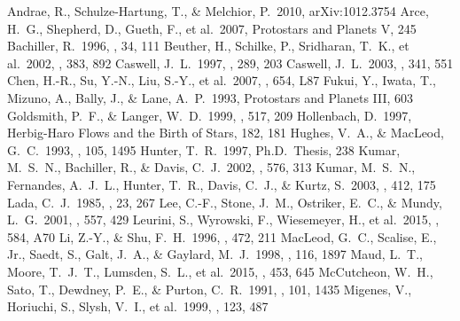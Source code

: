\documentclass[twocolumn]{aastex61}
\begin{document}
\begin{thebibliography}{}
 Andrae, R., Schulze-Hartung, T., \& Melchior, P.\ 2010, arXiv:1012.3754
 Arce, H.~G., Shepherd, D., Gueth, F., et al.\ 2007, Protostars and Planets V, 245 
 Bachiller, R.\ 1996, \araa, 34, 111 
 Beuther, H., Schilke, P., Sridharan, T.~K., et al.\ 2002, \aap, 383, 892
 Caswell, J.~L.\ 1997, \mnras, 289, 203 
 Caswell, J.~L.\ 2003, \mnras, 341, 551 
 Chen, H.-R., Su, Y.-N., Liu, S.-Y., et al.\ 2007, \apjl, 654, L87 
 Fukui, Y., Iwata, T., Mizuno, A., Bally, J., \& Lane, A.~P.\ 1993, Protostars and Planets III, 603
 Goldsmith, P.~F., \& Langer, W.~D.\ 1999, \apj, 517, 209 
 Hollenbach, D.\ 1997, Herbig-Haro Flows and the Birth of Stars, 182, 181 
 Hughes, V.~A., \& MacLeod, G.~C.\ 1993, \aj, 105, 1495
 Hunter, T.~R.\ 1997, Ph.D.~Thesis, 238 
 Kumar, M.~S.~N., Bachiller, R., \& Davis, C.~J.\ 2002, \apj, 576, 313 
 Kumar, M.~S.~N., Fernandes, A.~J.~L., Hunter, T.~R., Davis, C.~J., \& Kurtz, S.\ 2003, \aap, 412, 175 
 Lada, C.~J.\ 1985, \araa, 23, 267 
 Lee, C.-F., Stone, J.~M., Ostriker, E.~C., \& Mundy, L.~G.\ 2001, \apj, 557, 429 
 Leurini, S., Wyrowski, F., Wiesemeyer, H., et al.\ 2015, \aap, 584, A70 
 Li, Z.-Y., \& Shu, F.~H.\ 1996, \apj, 472, 211
 MacLeod, G.~C., Scalise, E., Jr., Saedt, S., Galt, J.~A., \& Gaylard, M.~J.\ 1998, \aj, 116, 1897 
 Maud, L.~T., Moore, T.~J.~T., Lumsden, S.~L., et al.\ 2015, \mnras, 453, 645
 McCutcheon, W.~H., Sato, T., Dewdney, P.~E., \& Purton, C.~R.\ 1991, \aj, 101, 1435 
 Migenes, V., Horiuchi, S., Slysh, V.~I., et al.\ 1999, \apjs, 123, 487

\end{thebibliography}
\end{document}

